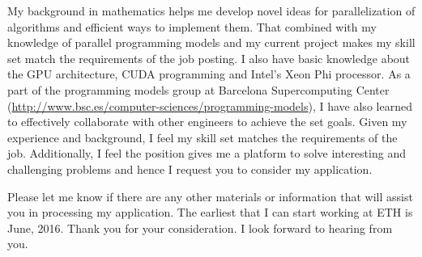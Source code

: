 \documentclass[10pt,stdletter,dateno]{newlfm}
\begin{document}
\begin{newlfm}
\par
	   My background in mathematics helps me develop novel ideas for parallelization of algorithms and efficient ways to implement them. 
	   That combined with my knowledge of parallel programming models and my current project makes my skill set match the requirements of the job posting.
	   I also have basic knowledge about the GPU architecture, CUDA programming and Intel's Xeon Phi processor. 
	   As a part of the programming models group at Barcelona Supercomputing Center (\url{http://www.bsc.es/computer-sciences/programming-models}), I have also learned to effectively collaborate with other engineers to achieve the set goals. 
	   Given my experience and background, I feel my skill set matches the requirements of the job. 
	   Additionally, I feel the position gives me a platform to solve interesting and challenging problems and hence I request you to consider my application. 
%
\par
Please let me know if there are any other materials or information that will assist you in processing my application. 
The earliest that I can start working at ETH is June, 2016.
Thank you for your consideration. I look forward to hearing from you.
%
\end{newlfm}
\end{document}

